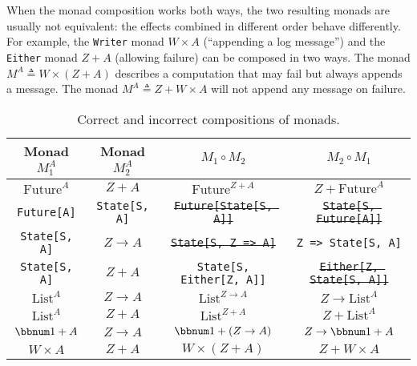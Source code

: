 When the monad composition works both ways, the two resulting monads
are usually not equivalent: the effects combined in different order
behave differently. For example, the \lstinline!Writer! monad $W\times A$
(\textsf{``}appending a log message\textsf{''}) and the \lstinline!Either! monad
$Z+A$ (allowing failure) can be composed in two ways. The monad $M^{A}\triangleq W\times\left(Z+A\right)$
describes a computation that may fail but always appends a message.
The monad $M^{A}\triangleq Z+W\times A$ will not append any message
on failure.
\begin{center}
\begin{table}[h]
\begin{centering}
\vspace{-0.8\baselineskip}
\begin{tabular}{|c|c|c|c|}
\hline 
\textbf{\small{}Monad $M_{1}^{A}$} & \textbf{\small{}Monad $M_{2}^{A}$} & \textbf{\small{}$M_{1}\circ M_{2}$} & \textbf{\small{}$M_{2}\circ M_{1}$}\tabularnewline
\hline 
\hline 
{\small{}$\text{Future}^{A}$} & {\small{}$Z+A$} & {\small{}$\text{Future}^{Z+A}$} & {\small{}\sout{\mbox{$Z+\text{Future}^{A}$}}}\tabularnewline
\hline 
\texttt{\small{}Future{[}A{]}} & \texttt{\small{}State{[}S, A{]}} & \texttt{\small{}\sout{Future{[}State{[}S, A{]}{]}}} & \texttt{\small{}\sout{State{[}S, Future{[}A{]}{]}}}\tabularnewline
\hline 
\texttt{\small{}State{[}S, A{]}} & {\small{}$Z\rightarrow A$} & \texttt{\small{}\sout{State{[}S, Z => A{]}}} & \texttt{\small{}Z => State{[}S, A{]}}\tabularnewline
\hline 
\texttt{\small{}State{[}S, A{]}} & {\small{}$Z+A$} & \texttt{\small{}State{[}S, Either{[}Z, A{]}{]}} & \texttt{\small{}\sout{Either{[}Z, State{[}S, A{]}{]}}}\tabularnewline
\hline 
{\small{}$\text{List}^{A}$} & {\small{}$Z\rightarrow A$} & {\small{}\sout{\mbox{$\text{List}^{Z\rightarrow A}$}}} & {\small{}$Z\rightarrow\text{List}^{A}$}\tabularnewline
\hline 
{\small{}$\text{List}^{A}$} & {\small{}$Z+A$} & {\small{}$\text{List}^{Z+A}$} & {\small{}\sout{\mbox{$Z+\text{List}^{A}$}}}\tabularnewline
\hline 
{\small{}$\bbnum 1+A$} & {\small{}$Z\rightarrow A$} & {\small{}\sout{\mbox{$\bbnum 1+\left(Z\rightarrow A\right)$}}} & {\small{}$Z\rightarrow\bbnum 1+A$}\tabularnewline
\hline 
{\small{}$W\times A$} & {\small{}$Z+A$} & {\small{}$W\times\left(Z+A\right)$} & {\small{}$Z+W\times A$}\tabularnewline
\hline 
\end{tabular}
\par\end{centering}
\caption{\label{tab:Correct-and-incorrect-compositions}Correct and incorrect
compositions of monads.}
\vspace{-2\baselineskip}
\end{table}
\par\end{center}

